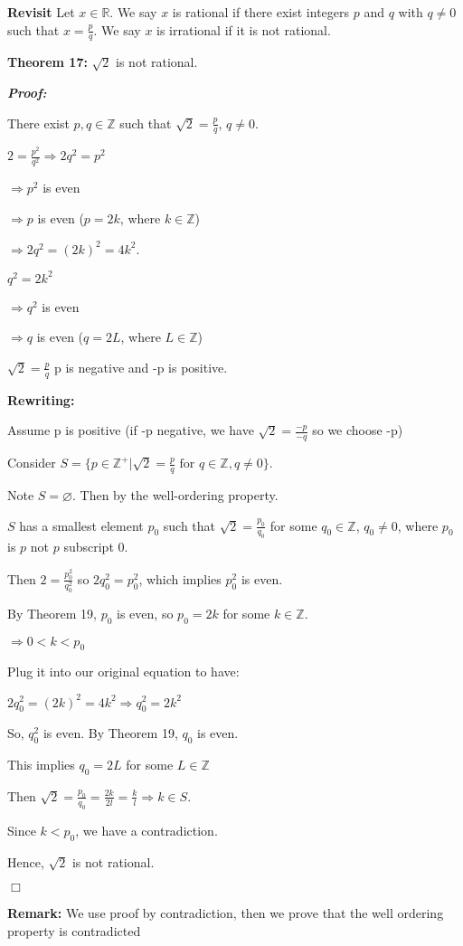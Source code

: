 \documentclass[12 pt]{article}        	%
\begin{document}
\newpage

\textbf{Revisit}
Let $x \in \mathbb{R}$. We say $x$ is rational if there exist integers $p$ and $q$ with $q \neq 0$ such that $x = \frac{p}{q}$. We say $x$ is irrational if it is not rational.

\textbf{Theorem 17:}
$\sqrt{2}$ is not rational.

\emph{\textbf{Proof:}}

\begin{center}

There exist $p, q \in \mathbb{Z}$ such that $\sqrt{2} = \frac{p}{q}$, $q \neq 0$.

$2 = \frac{p^2}{q^2} \Rightarrow 2q^2 = p^2$

$\Rightarrow p^2$ is even

$\Rightarrow p$ is even ($p = 2k$, where $k \in \mathbb{Z}$)

$\Rightarrow 2q^2 = (2k)^2 = 4k^2$.

$q^2 = 2k^2$

$\Rightarrow q^2$ is even

$\Rightarrow q$ is even ($q = 2L$, where $L \in \mathbb{Z}$)

$\sqrt{2} = \frac{p}{q}$ p is negative and -p is positive.

\end{center}

\textbf{Rewriting:}

\begin{center}

Assume p is positive (if -p negative, we have $\sqrt{2} = \frac{-p}{-q}$ so we choose -p)

Consider $S = \{ p \in \mathbb{Z}^+ | \sqrt{2} = \frac{p}{q} \text{ for } q \in \mathbb{Z}, q \neq 0 \}$.

Note $S = \varnothing$. Then by the well-ordering property. 

$S$ has a smallest element $p_0$ such that $\sqrt{2} = \frac{p_0}{q_0}$ for some $q_0 \in \mathbb{Z}$, $q_0 \neq 0$, where $p_0$ is $p$ not $p$ subscript $0$.

Then $2 = \frac{p_0^2}{q_0^2}$ so $2q_0^2 = p_0^2$, which implies $p_0^2$ is even.

By Theorem 19, $p_0$ is even, so $p_0 = 2k$ for some $k \in \mathbb{Z}$.

$\Rightarrow 0 < k < p_0$

Plug it into our original equation to have:

$2q_0^2 = (2k)^2 = 4k^2 \Rightarrow q_0^2 = 2k^2$

So, $q_0^2$ is even. By Theorem 19, $q_0$ is even.

This implies $q_0 = 2L$ for some $L \in \mathbb{Z}$

Then $\sqrt{2} = \frac{p_0}{q_0} = \frac{2k}{2l} = \frac{k}{l} \Rightarrow k \in S$.

Since $k < p_0$, we have a contradiction.

Hence, $\sqrt{2}$ is not rational.

$\Box$

\end{center}

\textbf{Remark:} We use proof by contradiction, then we prove that the well ordering property is contradicted
\end{document}
